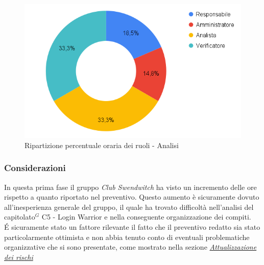 \begin{figure}[h!]
	\centering
	\includegraphics[scale=0.37]{../../assets/Diagrammi_Excel/torta_ore_Analisi.png}
	\caption{Ripartizione percentuale oraria dei ruoli - Analisi}
\end{figure}

\subsubsection{Considerazioni}
In questa prima fase il gruppo \textit{Club Swendwitch} ha visto un incremento delle ore rispetto a quanto riportato nel preventivo. Questo aumento è sicuramente dovuto all'inesperienza generale del gruppo, il quale ha trovato difficoltà nell'analisi del capitolato$^{G}$ C5 - Login Warrior e nella conseguente organizzazione dei compiti.\\
\'E sicuramente stato un fattore rilevante il fatto che il preventivo redatto sia stato particolarmente ottimista e non abbia tenuto conto di eventuali problematiche organizzative che si sono presentate, come mostrato nella sezione \hyperref[sec:AttualizzazioneRischi]{\textit{Attualizzazione dei rischi}}


